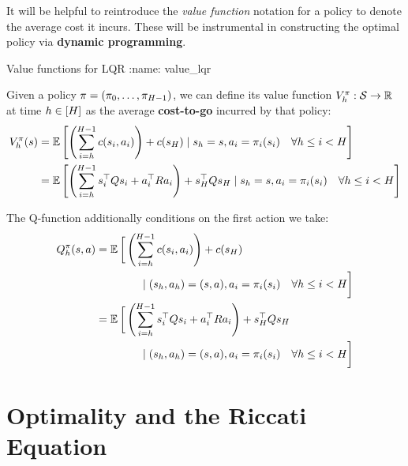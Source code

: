 \documentclass[\main/main]{subfiles}
\begin{document}
It will be helpful to reintroduce the \emph{value function} notation for a policy to denote the average cost it incurs.
These will be instrumental in constructing the optimal policy via \textbf{dynamic programming}.

\begin{definition}{Value functions for LQR}
:name: value_lqr

    Given a policy $\mathbf{\pi} = (\pi_0, \dots, \pi_{H-1})$, we can define its
    value function $V^\pi_h : \mathcal{S} \to \mathbb{R}$ at time $h \in [H]$ as the average \textbf{cost-to-go} incurred by that policy:
    \[
        \begin{split}
            V^\pi_h (s) &= \operatorname*{\mathbb{E}} \left[ \left( \sum_{i=h}^{H-1} c(s_i, a_i) \right) + c(s_H) \mid s_h = s,  a_i = \pi_i(s_i) \quad \forall h \le i < H \right] \\
            &= \operatorname*{\mathbb{E}} \left[ \left( \sum_{i=h}^{H-1} s_i^\top Q s_i + a_i^\top R a_i \right) + s_H^\top Q s_H \mid s_h = s, a_i = \pi_i(s_i) \quad \forall h \le i < H \right] \\
        \end{split}
    \]

    The Q-function additionally conditions on the first
    action we take:
    \[
        \begin{split}
            Q^\pi_h (s, a) &= \operatorname*{\mathbb{E}} \bigg[ \left( \sum_{i=h}^{H-1} c(s_i, a_i) \right) + c(s_H) \\
                &\qquad\qquad \mid  (s_h, a_h) = (s, a), a_i = \pi_i(s_i) \quad \forall h \le i < H \bigg] \\
            &= \operatorname*{\mathbb{E}} \bigg[ \left( \sum_{i=h}^{H-1} s_i^\top Q s_i + a_i^\top R a_i \right) + s_H^\top Q s_H \\
                &\qquad\qquad \mid (s_h, a_h) = (s, a), a_i = \pi_i(s_i) \quad \forall h \le i < H \bigg] \\
        \end{split}
    \]
\end{definition}


\section{Optimality and the Riccati Equation} \label{sec:optimal_lqr}
\end{document}

